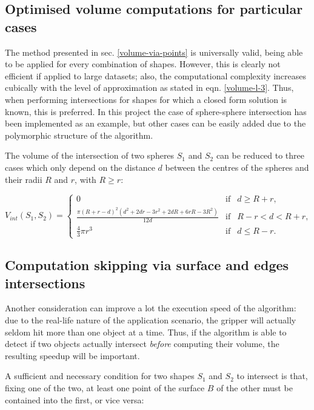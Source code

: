 \subsection{Optimised volume computations for particular cases}
The method presented in sec. \ref{volume-via-points} is universally valid,
being able to be applied for every combination of shapes. However, this is
clearly not efficient if applied to large datasets; also, the computational
complexity increases cubically with the level of approximation as stated in
eqn. \ref{volume-l-3}. Thus, when performing intersections for shapes for which
a closed form solution is known, this is preferred. In this project the case of
sphere-sphere intersection has been implemented as an example, but other cases
can be easily added due to the polymorphic structure of the algorithm.

The volume of the intersection of two spheres $S_1$ and $S_2$ can be reduced to three cases which only
depend on the distance $d$ between the centres of the spheres and their radii
$R$ and $r$, with $R\geq r$:

\begin{equation}
  V_{int}\left(S_1,S_2\right)=\left\{\begin{array}{lcr}
      0 & \mbox{if} & d\geq R+r, \\
      \frac{\pi \left(R+r-d\right) ^2 \left(
      d^2 + 2dr - 3r^2 + 2dR + 6rR-3R ^2 \right) }{12d}
      & \mbox{if} & R-r<d<R+r, \\
      \frac{4}{3}\pi r^3 & \mbox{if} & d \leq R-r.
  \end{array}\right.
\end{equation}

\subsection{Computation skipping via surface and edges intersections}
Another consideration can improve a lot the execution speed of the algorithm:
due to the real-life nature of the application scenario, the gripper will
actually seldom hit more than one object at a time. Thus, if the algorithm is
able to detect if two objects actually intersect \emph{before} computing their
volume, the resulting speedup will be important.

A sufficient and necessary condition for two shapes $S_1$ and $S_2$ to intersect is that, fixing
one of the two, at least one point of the surface $B$ of the other must be contained
into the first, or vice versa:

